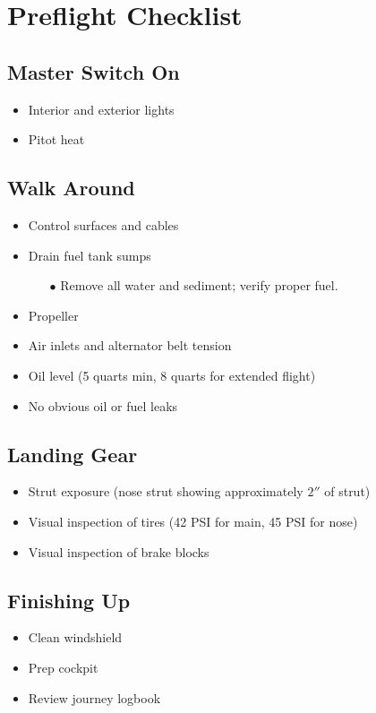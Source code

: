 \def\todoitem#1{
    \item[$\square$] #1 \dotfill
}

\section{Preflight Checklist}
\renewcommand{\rightmark}{Preflight Checklist}

\subsection{Master Switch On}

\begin{itemize}
    \todoitem{Interior and exterior lights}
    \todoitem{Pitot heat}
\end{itemize}

\subsection{Walk Around}

\begin{itemize}
    \todoitem{Control surfaces and cables}
    \todoitem{Drain fuel tank sumps}
    \begin{itemize}
        \item[$\bullet$] Remove all water and sediment; verify proper fuel.
    \end{itemize}
    \todoitem{Propeller}
    \todoitem{Air inlets and alternator belt tension}
    \todoitem{Oil level (5 quarts min, 8 quarts for extended flight)}
    \todoitem{No obvious oil or fuel leaks}
\end{itemize}

\subsection{Landing Gear}

\begin{itemize}
    \todoitem{Strut exposure (nose strut showing approximately $2''$ of strut)}
    \todoitem{Visual inspection of tires (42 PSI for main, 45 PSI for nose)}
    \todoitem{Visual inspection of brake blocks}
\end{itemize}

\subsection{Finishing Up}

\begin{itemize}
    \todoitem{Clean windshield}
    \todoitem{Prep cockpit}
    \todoitem{Review journey logbook}
\end{itemize}
